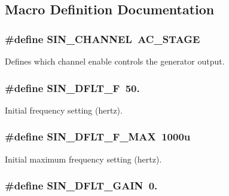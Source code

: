 \subsection{Macro Definition Documentation}
\hypertarget{a00045_a71b6211a4d077af219d7e503f17114d1}{
\subsubsection[{S\-I\-N\-\_\-\-C\-H\-A\-N\-N\-E\-L}]{\setlength{\rightskip}{0pt plus 5cm}\#define S\-I\-N\-\_\-\-C\-H\-A\-N\-N\-E\-L~{\bf A\-C\-\_\-\-S\-T\-A\-G\-E}}}\label{a00045_a71b6211a4d077af219d7e503f17114d1}
Defines which channel enable controls the generator output. \hypertarget{a00045_aa1d98c477c6de604fc6ca986f2d83238}{
\subsubsection[{S\-I\-N\-\_\-\-D\-F\-L\-T\-\_\-\-F}]{\setlength{\rightskip}{0pt plus 5cm}\#define S\-I\-N\-\_\-\-D\-F\-L\-T\-\_\-\-F~50.}}\label{a00045_aa1d98c477c6de604fc6ca986f2d83238}
Initial frequency setting (hertz). \hypertarget{a00045_a1640e33dcd5a970b4a9731ec68125bd6}{
\subsubsection[{S\-I\-N\-\_\-\-D\-F\-L\-T\-\_\-\-F\-\_\-\-M\-A\-X}]{\setlength{\rightskip}{0pt plus 5cm}\#define S\-I\-N\-\_\-\-D\-F\-L\-T\-\_\-\-F\-\_\-\-M\-A\-X~1000u}}\label{a00045_a1640e33dcd5a970b4a9731ec68125bd6}
Initial maximum frequency setting (hertz). \hypertarget{a00045_aa63a6918009b4e4381e359cee2f05eef}{
\subsubsection[{S\-I\-N\-\_\-\-D\-F\-L\-T\-\_\-\-G\-A\-I\-N}]{\setlength{\rightskip}{0pt plus 5cm}\#define S\-I\-N\-\_\-\-D\-F\-L\-T\-\_\-\-G\-A\-I\-N~0.}}\label{a00045_aa63a6918009b4e4381e359cee2f05eef}
